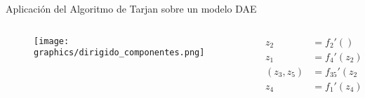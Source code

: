 \begin{frame}[fragile]{Aplicación del Algoritmo de Tarjan sobre un modelo DAE}
    \begin{columns}
        \begin{column}{0.5\textwidth}
            \begin{figure}
               \centering
               \texttt{[image: graphics/dirigido\_componentes.png]}
            \end{figure}
        \end{column}  
        \begin{column}{0.5\textwidth}
            \begin{align*}
            z_2 &= f_2'() \\
            z_1 &= f_4'(z_2) \\
            (z_3, z_5) &= f_{35}'(z_2) \\
            z_4 &= f_1'(z_4) \\
            \end{align*}
        \end{column}
    \end{columns}
\end{frame}
